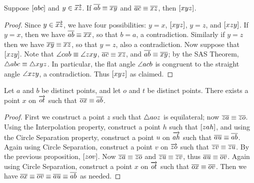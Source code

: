 \begin{lem}
Suppose \([ a b c ]\) and \(y \in \overrightarrow{xz}\).
If \(\overline{ab} \equiv \overline{xy}\) and \(\overline{ac} \equiv \overline{xz}\), then \([ x y z ]\).
\end{lem}

\begin{proof}
Since \(y \in \overrightarrow{xz}\), we have four possibilities: \(y = x\), \([ x y z ]\), \(y = z\), and \([ x z y ]\).
If \(y = x\), then we have \(\overline{ab} \equiv \overline{xx}\), so that \(b = a\), a contradiction.
Similarly if \(y = z\) then we have \(\overline{xy} \equiv \overline{xz}\), so that \(y = z\), also a contradiction.
Now suppose that \([ x z y ]\).
Note that \(\angle{cab} \equiv \angle{zxy}\), \(\overline{ac} \equiv \overline{xz}\), and \(\overline{ab} \equiv \overline{xy}\); by the SAS Theorem, \(\bigtriangleup{abc} \equiv \bigtriangleup{xyz}\).
In particular, the flat angle \(\angle{acb}\) is congruent to the straight angle \(\angle{xzy}\), a contradiction.
Thus \([ x y z ]\) as claimed.
\end{proof}

\begin{construct}
Let \(a\) and \(b\) be distinct points, and let \(o\) and \(t\) be distinct points.
There exists a point \(x\) on \(\overrightarrow{ot}\) such that \(\overline{ox} \equiv \overline{ab}\).
\end{construct}

\begin{proof}
First we construct a point \(z\) such that \(\bigtriangleup{aoz}\) is equilateral; now \(\overline{za} \equiv \overline{zo}\).
Using the Interpolation property, construct a point \(h\) such that \([ z a h ]\), and using the Circle Separation property, construct a point \(u\) on \(\overrightarrow{ah}\) such that \(\overline{au} \equiv \overline{ab}\).
Again using Circle Separation, construct a point \(v\) on \(\overrightarrow{zo}\) such that \(\overline{zv} \equiv \overline{zu}\).
By the previous proposition, \([ z o v ]\).
Now \(\overline{za} \equiv \overline{zo}\) and \(\overline{zu} \equiv \overline{zv}\), thus \(\overline{au} \equiv \overline{ov}\).
Again using Circle Separation, construct a point \(x\) on \(\overrightarrow{ot}\) such that \(\overline{ox} \equiv \overline{ov}\).
Then we have \(\overline{ox} \equiv \overline{ov} \equiv \overline{au} \equiv \overline{ab}\) as needed.
\end{proof}

